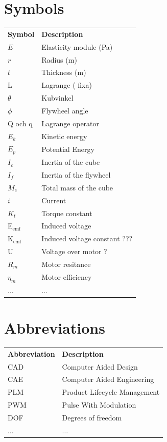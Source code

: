 \documentclass[a4paper,11pt]{kth-mag}
\newcommand{\textunderscript}[1]{$_{\text{#1}}$}
\begin{document}
\section*{Symbols}
\noindent{}\begin{tabular}{@{}p{2.5cm}l}
\textbf{Symbol} 	& \textbf{Description} \vspace{.5em} \\
$E$ 		& Elasticity module (Pa) \\
$r$		& Radius (m) \\
$t$		& Thickness (m) \\
L			& Lagrange ( fixa) \\
$\theta$		& Kubvinkel \\
$\phi$		& Flywheel angle \\
Q och q		& Lagrange operator \\
$E_k	$		& Kinetic energy \\
$E_p$		& Potential Energy \\
$I_c$		& Inertia of the cube\\
$I_f$		& Inertia of the flywheel\\
$M_c$		& Total mass of the cube \\
$i$			& Current\\
$K_t$		& Torque constant\\

E\textunderscript{emf} 	& Induced voltage \\
K\textunderscript{emf} 	& Induced voltage constant ??? \\

U			& Voltage over motor ?\\
$R_m	$		& Motor resitance \\
$\eta_m$		& Motor efficiency\\	
$\ldots$	& $\ldots$ 
\end{tabular}

\section*{Abbreviations}
\noindent{}\begin{tabular}{@{}p{2.5cm}l}
\textbf{Abbreviation} 	& \textbf{Description} \vspace{.5em} \\
CAD			& Computer Aided Design \\
CAE			& Computer Aided Engineering\\
PLM			& Product Lifecycle Management\\
PWM			& Pulse With Modulation\\
DOF			& Degrees of freedom\\

$\ldots$		& $\ldots$ 
\end{tabular}
\cleardoublepage
\end{document}
